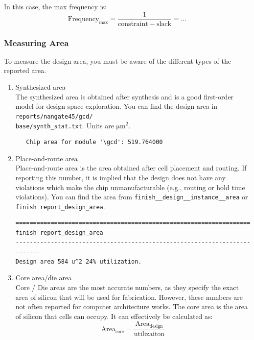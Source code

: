 \documentclass[a4paper,12pt,twoside]{article}
\begin{document}
In this case, the max frequency is:
\begin{equation}\label{EEq1}
    \mathrm{Frequency_{max}=\frac{1}{constraint-slack}=}\dots
\end{equation}
\subsubsection{Measuring Area}
To measure the design area, you must be aware of the different types of the reported area.
\begin{enumerate}
    \item Synthesized area\\
    The synthesized area is obtained after synthesis and is a good first-order model for design space exploration. You can find the design area in \texttt{reports/nangate45/gcd/\\
    base/synth\_stat.txt}. Units are $\mathrm{\mu m^2}$.
    \begin{verbatim}
   Chip area for module '\gcd': 519.764000
    \end{verbatim}
    \item Place-and-route area\\
    Place-and-route area is the area obtained after cell placement and routing. If reporting this number, it is implied that the design does not have any violations which make the chip unmanufacturable (e.g., routing or hold time violations). You can find the area from \texttt{finish\_\_design\_\_instance\_\_area} or \texttt{finish report\_design\_area}.
    \begin{verbatim}
==========================================================================
finish report_design_area
--------------------------------------------------------------------------
Design area 584 u^2 24% utilization.
    \end{verbatim}
    \item Core area/die area\\
    Core / Die areas are the most accurate numbers, as they specify the exact area of silicon that will be used for fabrication. However, these numbers are not often reported for computer architecture works. The core area is the area of silicon that cells can occupy. It can effectively be calculated as:
    \begin{equation}
        \mathrm{Area_{core}=\frac{Area_{design}}{utilizaiton}}

\end{equation}
\end{enumerate}
\end{document}

